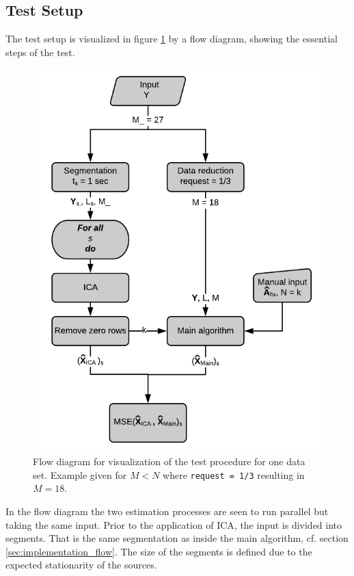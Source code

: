 \subsection{Test Setup}
The test setup is visualized in figure \ref{fig:flow2} by a flow diagram, showing the essential steps of the test. 
\begin{figure}[H]
    \centering
	\includegraphics[scale=1]{figures/ch_7/flow2.png}
	\caption{Flow diagram for visualization of the test procedure for one data set. Example given for $M < N$ where \texttt{request = 1/3} resulting in $M = 18$.}
	\label{fig:flow2}
\end{figure}
\noindent
In the flow diagram the two estimation processes are seen to run parallel but taking the same input. 
Prior to the application of ICA, the input is divided into segments. 
That is the same segmentation as inside the main algorithm, cf. section \ref{sec:implementation_flow}.
The size of the segments is defined due to the expected stationarity of the sources. 
